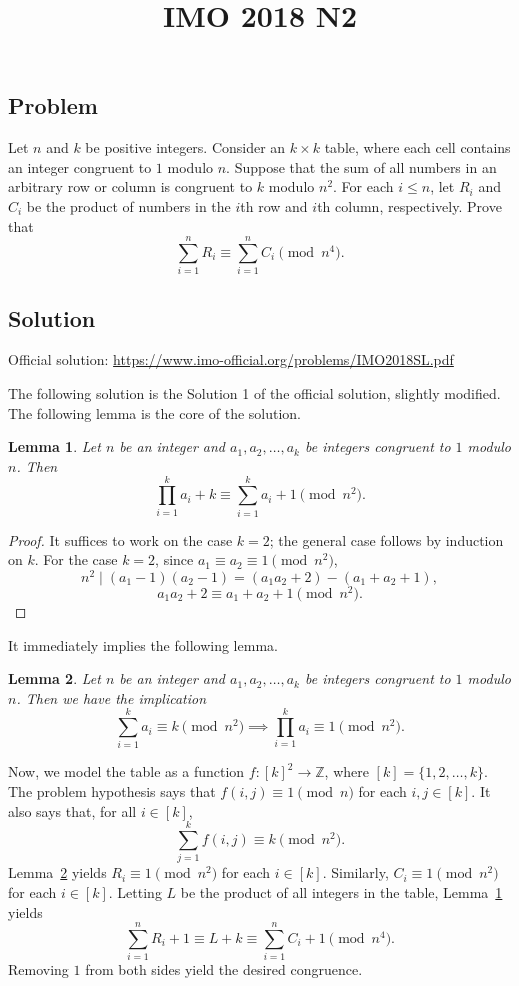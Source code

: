 \documentclass{article}
\title{IMO 2018 N2}
\author{}
\date{}
\newcommand{\Z}{\mathbb{Z}}
\newtheorem{lemma}{Lemma}
\begin{document}
\maketitle



\subsection*{Problem}

Let $n$ and $k$ be positive integers.
Consider an $k \times k$ table, where each cell contains an integer congruent to $1$ modulo $n$.
Suppose that the sum of all numbers in an arbitrary row or column is congruent to $k$ modulo $n^2$.
For each $i \leq n$, let $R_i$ and $C_i$ be the product of numbers in the $i$th row and $i$th column, respectively.
Prove that
\[ \sum_{i = 1}^n R_i \equiv \sum_{i = 1}^n C_i \pmod{n^4}. \]



\subsection*{Solution}

Official solution: \url{https://www.imo-official.org/problems/IMO2018SL.pdf}

The following solution is the Solution 1 of the official solution, slightly modified.
The following lemma is the core of the solution.

\begin{lemma}\label{2018n2-1}
Let $n$ be an integer and $a_1, a_2, \ldots, a_k$ be integers congruent to $1$ modulo $n$.
Then \[ \prod_{i = 1}^k a_i + k \equiv \sum_{i = 1}^k a_i + 1 \pmod{n^2}. \]
\end{lemma}
\begin{proof}
It suffices to work on the case $k = 2$; the general case follows by induction on $k$.
For the case $k = 2$, since $a_1 \equiv a_2 \equiv 1 \pmod{n^2}$,
\[ n^2 \mid (a_1 - 1)(a_2 - 1) = (a_1 a_2 + 2) - (a_1 + a_2 + 1), \]
\[ a_1 a_2 + 2 \equiv a_1 + a_2 + 1 \pmod{n^2}. \]
\end{proof}

It immediately implies the following lemma.

\begin{lemma}\label{2018n2-2}
Let $n$ be an integer and $a_1, a_2, \ldots, a_k$ be integers congruent to $1$ modulo $n$.
Then we have the implication
\[ \sum_{i = 1}^k a_i \equiv k \pmod{n^2} \implies \prod_{i = 1}^k a_i \equiv 1 \pmod{n^2}. \]
\end{lemma}

Now, we model the table as a function $f : [k]^2 \to \Z$, where $[k] = \{1, 2, \ldots, k\}$.
The problem hypothesis says that $f(i, j) \equiv 1 \pmod{n}$ for each $i, j \in [k]$.
It also says that, for all $i \in [k]$,
\[ \sum_{j = 1}^k f(i, j) \equiv k \pmod{n^2}. \]
Lemma~\ref{2018n2-2} yields $R_i \equiv 1 \pmod{n^2}$ for each $i \in [k]$.
Similarly, $C_i \equiv 1 \pmod{n^2}$ for each $i \in [k]$.
Letting $L$ be the product of all integers in the table, Lemma~\ref{2018n2-1} yields
\[ \sum_{i = 1}^n R_i + 1 \equiv L + k \equiv \sum_{i = 1}^n C_i + 1 \pmod{n^4}. \]
Removing $1$ from both sides yield the desired congruence.
\end{document}
